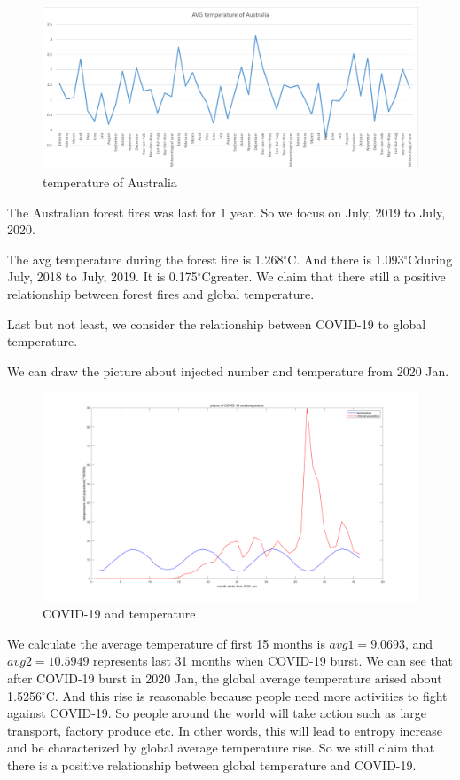 \documentclass{apmcmthesis}
\def\oc{$^{\circ}$C\;}
\begin{document}
\begin{figure}[htbp]
  \centering
  \includegraphics[scale=0.5]{Australia.png}
  \caption{temperature of Australia}\label{fig14}
\end{figure}

The Australian forest fires was last for 1 year.
So we focus on July, 2019 to July, 2020.

The avg temperature during the forest fire is 1.268\oc.
And there is 1.093\oc during July, 2018 to July, 2019.
It is 0.175\oc greater.
We claim that there still a positive relationship between forest fires and global temperature.

Last but not least, we consider the relationship between COVID-19 to global temperature.

We can draw the picture about injected number and temperature from 2020 Jan. 

\begin{figure}[htbp]
  \centering
  \includegraphics[scale=0.2]{COVID-19.png}
  \caption{COVID-19 and temperature}\label{fig15}
\end{figure}

We calculate the average temperature of first 15 months is $avg1=9.0693$,
and $avg2=10.5949$ represents last 31 months when COVID-19 burst. 
We can see that after COVID-19 burst in 2020 Jan, the global average temperature arised about 1.5256\oc.
And this rise is reasonable because people need more activities to fight against COVID-19.
So people around the world will take action such as large transport, factory produce etc. 
In other words, this will lead to entropy increase and be characterized by global average temperature rise.
So we still claim that there is a positive relationship between global temperature and COVID-19.
\end{document}
